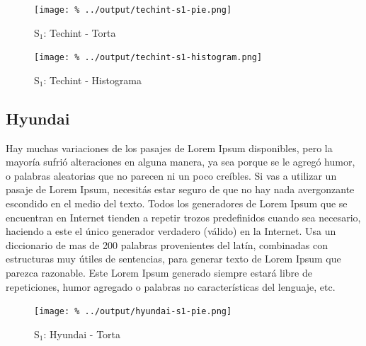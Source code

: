 \documentclass[final,inline,a4paper,narroweqnarray]{ieee}
\begin{document}
    \begin{figure}[ht]\begin{center}
      \texttt{[image: \%
      ../output/techint-s1-pie.png]}
      \vspace{-2em}
      \caption{S$_1$: Techint - Torta}
      \label{techint-s1-pie}
    \end{center}\end{figure}

    \begin{figure}[ht]\begin{center}
      \texttt{[image: \%
      ../output/techint-s1-histogram.png]}
      \vspace{-2em}
      \caption{S$_1$: Techint - Histograma}
      \label{techint-s1-histogram}
    \end{center}\end{figure}


  \subsection{Hyundai}

Hay muchas variaciones de los pasajes de Lorem Ipsum disponibles, pero la mayoría sufrió alteraciones en alguna manera, ya sea porque se le agregó humor, o palabras aleatorias que no parecen ni un poco creíbles. Si vas a utilizar un pasaje de Lorem Ipsum, necesitás estar seguro de que no hay nada avergonzante escondido en el medio del texto. Todos los generadores de Lorem Ipsum que se encuentran en Internet tienden a repetir trozos predefinidos cuando sea necesario, haciendo a este el único generador verdadero (válido) en la Internet. Usa un diccionario de mas de 200 palabras provenientes del latín, combinadas con estructuras muy útiles de sentencias, para generar texto de Lorem Ipsum que parezca razonable. Este Lorem Ipsum generado siempre estará libre de repeticiones, humor agregado o palabras no características del lenguaje, etc.

    \begin{figure}[ht]\begin{center}
      \texttt{[image: \%
      ../output/hyundai-s1-pie.png]}
      \vspace{-2em}
      \caption{S$_1$: Hyundai - Torta}
      \label{hyundai-s1-pie}
    \end{center}\end{figure}
\end{document}
